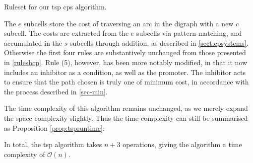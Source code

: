 \begin{cprulesetfloat}
    \begin{cpruleset}
        
        
        
        
        
        
    \end{cpruleset}
    \caption[Ruleset for the ]{\label{rulestsp}Ruleset for our \gls{tsp} \gls{cps} algorithm.}
\end{cprulesetfloat}

The \(e\) subcells store the cost of traversing an arc in the digraph with a new \(c\) subcell.  The costs are extracted from the \(e\) subcells via pattern-matching, and accumulated in the \(s\) subcells through addition, as described in \autoref{sect:cpsystems}. Otherwise the first four rules are substantively unchanged from those presented in \autoref{ruleshcp}.  Rule (5), however, has been more notably modified, in that it now includes an inhibitor as a condition, as well as the promoter.  The inhibitor acts to ensure that the path chosen is truly one of minimum cost, in accordance with the process described in \autoref{sec-min}.

The time complexity of this algorithm remains unchanged, as we merely expand the space complexity slightly.  Thus the time complexity can still be summarised as Proposition \ref{prop:tspruntime}:

\begin{proposition}
In total, the \gls{tsp} algorithm takes \(n + 3\) operations, giving the algorithm a time complexity of \(\mathcal{O}(n)\).
\label{prop:tspruntime}
\end{proposition}